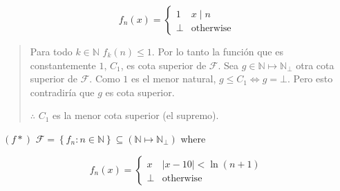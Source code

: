 \documentclass[a4paper, 12pt]{article}
\begin{document}
\begin{equation*}
  f_n(x) = \begin{cases}
    1 & x \mid n \\ 
    \bot & \text{otherwise}
  \end{cases}
\end{equation*}


\small
\begin{quote}

Para todo $k\in \mathbb{N}$ $f_k(n) \leq 1$. Por lo tanto la función que es
constantemente $1$, $C_1$, es cota superior de $\mathcal{F}$. Sea 
$g \in \mathbb{N} \mapsto \mathbb{N}_\bot$ otra cota superior de $\mathcal{F}$.
Como $1$ es el menor natural, $g \leq C_1 \iff g = \bot $. Pero esto
contradiría que $g$ es cota superior. 

$\therefore $ $C_1$ es la menor cota superior (el supremo).


\end{quote}
\normalsize


$(f*)$ $\mathcal{F} = \left\{ f_n : n \in \mathbb{N} \right\} \subseteq
\left( \mathbb{N} \mapsto \mathbb{N}_\bot  \right) $ where 

\begin{equation*}
  f_n(x) = \begin{cases}
    x & |x - 10| < \ln \left( n + 1 \right) \\ 
    \bot  & \text{otherwise}
  \end{cases}
\end{equation*}
\end{document}
